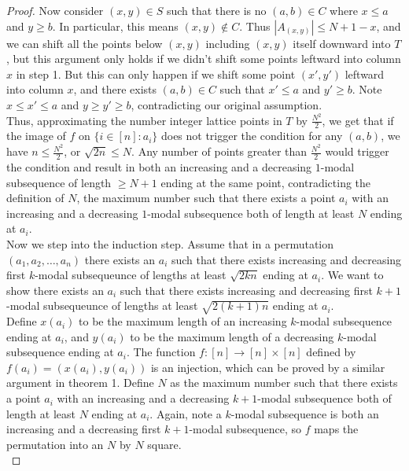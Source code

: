 \documentclass[10pt,a4paper]{amsart}
\begin{document}
\begin{proof}
Now consider $(x,y) \in S$ such that there is no $(a,b) \in C$ where $x \leq a$ and $y \geq b$. In particular, this means $(x,y) \not\in C$. Thus $|A_{(x,y)}| \leq N+1-x$, and we can shift all the points below $(x,y)$ including $(x,y)$ itself downward into $T$, but this argument only holds if we didn't shift some points leftward into column $x$ in step 1. But this can only happen if we shift some point $(x',y')$ leftward into column $x$, and there exists $(a,b) \in C$ such that $x' \leq a$ and $y' \geq b$. Note $x \leq x' \leq a$ and $y \geq y' \geq b$, contradicting our original assumption. \\

Thus, approximating the number integer lattice points in $T$ by $\frac{N^2}{2}$, we get that if the image of $f$ on $\{i \in [n] : a_i\}$ does not trigger the condition for any $(a,b)$, we have $n \leq \frac{N^2}{2}$, or $\sqrt{2n} \leq N$. Any number of points greater than $\frac{N^2}{2}$ would trigger the condition and result in both an increasing and a decreasing $1$-modal subsequence of length $\geq N+1$ ending at the same point, contradicting the definition of $N$, the maximum number such that there exists a point $a_i$ with an increasing and a decreasing $1$-modal subsequence both of length at least $N$ ending at $a_i$.  \\

Now we step into the induction step. Assume that in a permutation $(a_1, a_2, \ldots, a_n)$ there exists an $a_i$ such that there exists increasing and decreasing first $k$-modal subsequeunce of lengths at least $\sqrt{2kn}$ ending at $a_i$. We want to show there exists an $a_i$ such that there exists increasing and decreasing first $k+1$-modal subsequeunce of lengths at least $\sqrt{2(k+1)n}$ ending at $a_i$. \\

Define $x(a_i)$ to be the maximum length of an increasing $k$-modal subsequence ending at $a_i$, and $y(a_i)$ to be the maximum length of a decreasing $k$-modal subsequence ending at $a_i$. The function $f : [n] \rightarrow [n] \times [n]$ defined by $f(a_i) = (x(a_i), y(a_i))$ is an injection, which can be proved by a similar argument in theorem 1. Define $N$ as the maximum number such that there exists a point $a_i$ with an increasing and a decreasing $k+1$-modal subsequence both of length at least $N$ ending at $a_i$. Again, note a $k$-modal subsequence is both an increasing and a decreasing first $k+1$-modal subsequence, so $f$ maps the permutation into an $N$ by $N$ square. \\


\end{proof}
\end{document}
